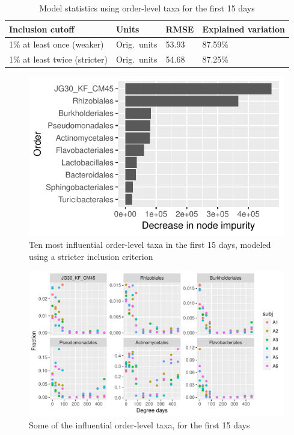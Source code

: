 \documentclass{article}
\begin{document}
\begin{table}
  \centering
  \caption{\label{tbl:order_first_15days_model_stats}Model statistics using order-level taxa for the first 15 days}
\begin{tabular}{llll}
Inclusion cutoff & Units  & RMSE & Explained variation\\ \hline
1\% at least once (weaker) & Orig.~units & 53.93 & 87.59\%\\
1\% at least twice (stricter) & Orig.~units & 54.68 & 87.25\%
\end{tabular}
\end{table}

\begin{figure}
  \centering
  \includegraphics{../../only_orders/first_two_weeks/hit_1perc_twice/orig_units_first_two_weeks_orders_barchart}
  \caption{Ten most influential order-level taxa in the first 15 days, modeled using a stricter inclusion criterion}
  \label{fig:infl_order_taxa_first_15days_stric_crit}
\end{figure}

\begin{figure}
  \centering
  \includegraphics{../../only_orders/first_two_weeks/influential_order_taxa_panel_first_two_weeks}
  \caption{Some of the influential order-level taxa, for the first 15 days}
  \label{fig:scatter_order_taxa_first_15days}
\end{figure}
\end{document}
